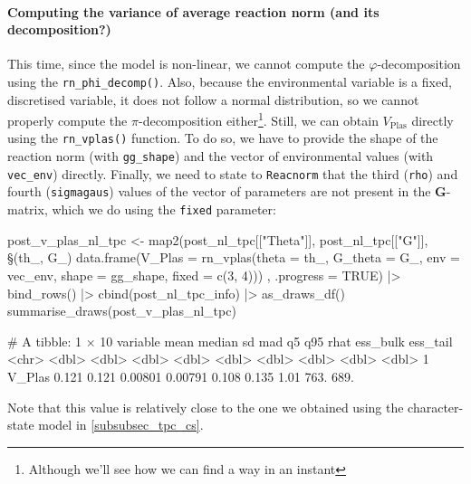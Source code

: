 \documentclass[a4paper,12pt,twoside]{article}
\begin{document}
\paragraph{Computing the variance of average reaction norm (and its decomposition?)}
This time, since the model is non-linear, we cannot compute the $\varphi$-decomposition using the \texttt{rn\_phi\_decomp()}.
Also, because the environmental variable is a fixed, discretised variable, it does not follow a normal distribution, so we cannot properly compute the $\pi$-decomposition either\footnote{Although we'll see how we can find a way in an instant}.
Still, we can obtain $V_{\text{Plas}}$ directly using the \texttt{rn\_vplas()} function. To do so, we have to provide the shape of the reaction norm (with \texttt{gg\_shape}) and the vector of environmental values (with \texttt{vec\_env}) directly.
Finally, we need to state to \texttt{Reacnorm} that the third (\texttt{rho}) and fourth (\texttt{sigmagaus}) values of the vector of parameters are not present in the $\mathbf{G}$-matrix, which we do using the \texttt{fixed} parameter:
\begin{Rinput}
post_v_plas_nl_tpc <-
    map2(post_nl_tpc[["Theta"]], post_nl_tpc[["G"]],
         \§§(th_, G_) { data.frame(V_Plas = rn_vplas(theta    = th_,
                                                   G_theta  = G_,
                                                   env      = vec_env,
                                                   shape    = gg_shape,
                                                   fixed    = c(3, 4))) },
         .progress = TRUE) |>
    bind_rows() |>
    cbind(post_nl_tpc_info) |>
    as_draws_df()
summarise_draws(post_v_plas_nl_tpc)
\end{Rinput}
\begin{Routput}
# A tibble: 1 × 10
  variable  mean median      sd     mad    q5   q95  rhat ess_bulk ess_tail
  <chr>    <dbl>  <dbl>   <dbl>   <dbl> <dbl> <dbl> <dbl>    <dbl>    <dbl>
1 V_Plas   0.121  0.121 0.00801 0.00791 0.108 0.135  1.01     763.     689.
\end{Routput}
Note that this value is relatively close to the one we obtained using the character-state model in \autoref{subsubsec_tpc_cs}.
\end{document}
